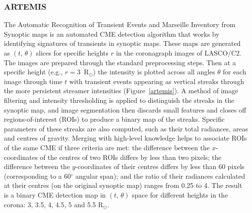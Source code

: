 \documentclass[namedreferences]{SolarPhysics}
\begin{document}
\begin{article}
\subsubsection{ARTEMIS}

The Automatic Recognition of Transient Events and Marseille Inventory from Synoptic maps \citep[ARTEMIS\footnote{http://www.oamp.fr/lasco/};][]{2009SoPh..257..125B} is an automated CME detection algorithm that works by identifying signatures of transients in synoptic maps. These maps are generated as $(t,\, \theta)$ slices for specific heights $r$ in the coronagraph images of LASCO/C2. The images are prepared through the standard preprocessing steps. Then at a specific height (e.g., $r=3$~R$_{\odot}$) the intensity is plotted across all angles $\theta$ for each image through time $t$ with transient events appearing as vertical streaks through the more persistent streamer intensities (Figure~\ref{artemis}). A method of image filtering and intensity thresholding is applied to distinguish the streaks in the synoptic map, and image segmentation then discards small features and closes off regions-of-interest (ROIs) to produce a binary map of the streaks. Specific parameters of these streaks are also computed, such as their total radiances, areas and centres of gravity. Merging with high-level knowledge helps to associate ROIs of the same CME if three criteria are met: the difference between the $x$-coordinates of the centres of two ROIs differs by less than two pixels; the difference between the $y$-coordinates of their centres differs by less than 60 pixels (corresponding to a 60$^{\circ}$ angular span); and the ratio of their radiances calculated at their centres (on the original synoptic map) ranges from 0.25 to 4. The result is a binary CME detection map in $(t,\, \theta)$ space for different heights in the corona: 3, 3.5, 4, 4.5, 5 and 5.5 R$_{\odot}$.


\end{article}
\end{document}
